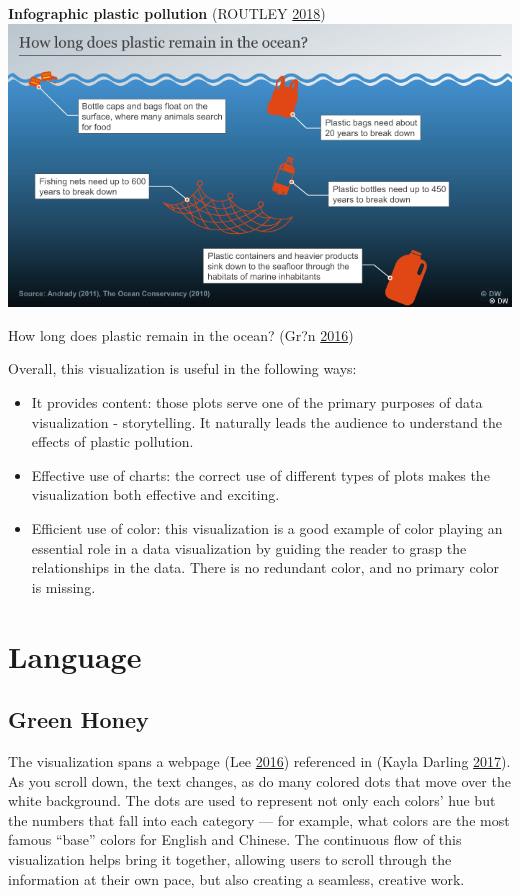 \documentclass[]{book}
\providecommand{\tightlist}{%
  \setlength{\itemsep}{0pt}\setlength{\parskip}{0pt}}
\theoremstyle{definition}
\theoremstyle{definition}
\theoremstyle{definition}
\theoremstyle{remark}
\begin{document}
\textbf{Infographic plastic pollution} (ROUTLEY
\protect\hyperlink{ref-plastic_pollution_infographics}{2018})
\includegraphics{images/ocean_plastic.png}

How long does plastic remain in the ocean? (Gr?n
\protect\hyperlink{ref-plastic_pollution_visualizations}{2016})

Overall, this visualization is useful in the following ways:

\begin{itemize}
\tightlist
\item
  It provides content: those plots serve one of the primary purposes of
  data visualization - storytelling. It naturally leads the audience to
  understand the effects of plastic pollution.
\item
  Effective use of charts: the correct use of different types of plots
  makes the visualization both effective and exciting.
\item
  Efficient use of color: this visualization is a good example of color
  playing an essential role in a data visualization by guiding the
  reader to grasp the relationships in the data. There is no redundant
  color, and no primary color is missing.
\end{itemize}

\section{Language}\label{language}

\subsection{Green Honey}\label{green-honey}

The visualization spans a webpage (Lee
\protect\hyperlink{ref-green_honey}{2016}) referenced in (Kayla Darling
\protect\hyperlink{ref-cool_data}{2017}). As you scroll down, the text
changes, as do many colored dots that move over the white background.
The dots are used to represent not only each colors' hue but the numbers
that fall into each category --- for example, what colors are the most
famous ``base'' colors for English and Chinese. The continuous flow of
this visualization helps bring it together, allowing users to scroll
through the information at their own pace, but also creating a seamless,
creative work.
\end{document}
